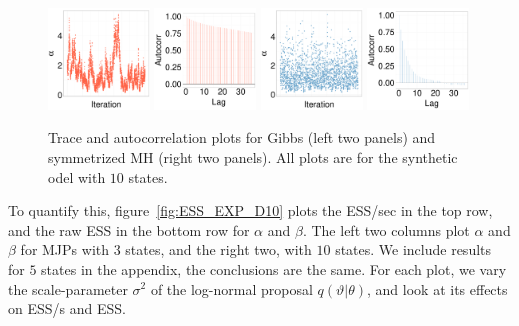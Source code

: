   \begin{figure}[H]
  \centering
  \begin{minipage}[!hp]{0.97\linewidth}
    \includegraphics [width=0.24\textwidth, angle=0]{figs/EXP_ks/exp_traceGBS_44_05_10_.pdf}
    \includegraphics [width=0.24\textwidth, angle=0]{figs/EXP_ks/exp_gbsacf_44_05_10_.pdf}
    \includegraphics [width=0.24\textwidth, angle=0]{figs/EXP_ks/exp_traceMH_44_05_10_.pdf}
    \includegraphics [width=0.24\textwidth, angle=0]{figs/EXP_ks/exp_mhacf_44_05_10_.pdf}
  \end{minipage}
  \caption{Trace and autocorrelation plots for Gibbs (left two panels) and symmetrized MH (right two panels). All plots are for the synthetic odel with $10$ states.}
     \label{fig:TRACE_EXP}
  \end{figure}
  To quantify this, figure~\ref{fig:ESS_EXP_D10} plots the ESS/sec in the top row, and the raw ESS in the bottom row for $\alpha$  and $\beta$. 
  The left two columns plot $\alpha$ and $\beta$ for MJPs with $3$ states, and the right two, with $10$ states. 
  We include results for $5$ states in the appendix, the conclusions are the same. 
  For each plot, we vary the scale-parameter $\sigma^2$ of the log-normal proposal $q(\vartheta|\theta)$, and look at its effects on ESS/s and ESS. 
